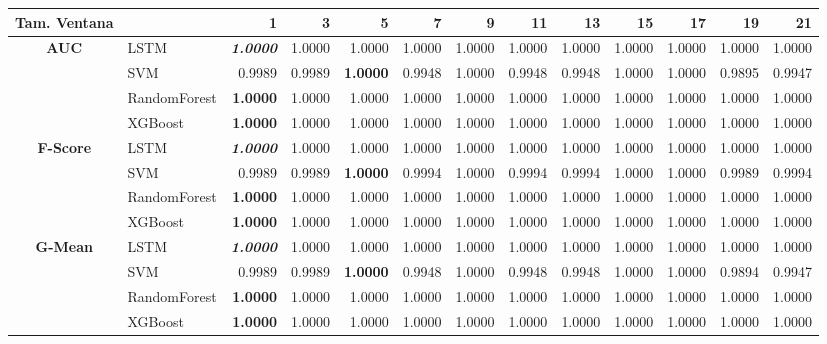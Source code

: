 \begin{table}[H]
	\centering
	\begin{adjustbox}{max width=13cm}
		\begin{tabular}{|c|l|r|r|r|r|r|r|r|r|r|r|r|}
			\hline
			\textbf{Tam. Ventana}&         &      1  &      3  &   5  &      7  &   9  &      11 &      13 &   15 &   17 &      19 &      21 \\
			\hline
			\textbf{AUC} &  LSTM & \textit{ \textbf{  1.0000 } } &  1.0000 &  1.0000 &  1.0000 &  1.0000 &  1.0000 &  1.0000 &  1.0000 &  1.0000 &  1.0000 &  1.0000 \\
			&  SVM &  0.9989 &  0.9989 & \textbf{  1.0000 } &  0.9948 &  1.0000 &  0.9948 &  0.9948 &  1.0000 &  1.0000 &  0.9895 &  0.9947 \\
			&  RandomForest & \textbf{  1.0000 } &  1.0000 &  1.0000 &  1.0000 &  1.0000 &  1.0000 &  1.0000 &  1.0000 &  1.0000 &  1.0000 &  1.0000 \\
			&  XGBoost & \textbf{  1.0000 } &  1.0000 &  1.0000 &  1.0000 &  1.0000 &  1.0000 &  1.0000 &  1.0000 &  1.0000 &  1.0000 &  1.0000 \\
			\hline
			\textbf{F-Score} &  LSTM & \textit{ \textbf{  1.0000 } } &  1.0000 &  1.0000 &  1.0000 &  1.0000 &  1.0000 &  1.0000 &  1.0000 &  1.0000 &  1.0000 &  1.0000 \\
			&  SVM &  0.9989 &  0.9989 & \textbf{  1.0000 } &  0.9994 &  1.0000 &  0.9994 &  0.9994 &  1.0000 &  1.0000 &  0.9989 &  0.9994 \\
			&  RandomForest & \textbf{  1.0000 } &  1.0000 &  1.0000 &  1.0000 &  1.0000 &  1.0000 &  1.0000 &  1.0000 &  1.0000 &  1.0000 &  1.0000 \\
			&  XGBoost & \textbf{  1.0000 } &  1.0000 &  1.0000 &  1.0000 &  1.0000 &  1.0000 &  1.0000 &  1.0000 &  1.0000 &  1.0000 &  1.0000 \\
			\hline
			\textbf{G-Mean} &  LSTM & \textit{ \textbf{  1.0000 } } &  1.0000 &  1.0000 &  1.0000 &  1.0000 &  1.0000 &  1.0000 &  1.0000 &  1.0000 &  1.0000 &  1.0000 \\
			&  SVM &  0.9989 &  0.9989 & \textbf{  1.0000 } &  0.9948 &  1.0000 &  0.9948 &  0.9948 &  1.0000 &  1.0000 &  0.9894 &  0.9947 \\
			&  RandomForest & \textbf{  1.0000 } &  1.0000 &  1.0000 &  1.0000 &  1.0000 &  1.0000 &  1.0000 &  1.0000 &  1.0000 &  1.0000 &  1.0000 \\
			&  XGBoost & \textbf{  1.0000 } &  1.0000 &  1.0000 &  1.0000 &  1.0000 &  1.0000 &  1.0000 &  1.0000 &  1.0000 &  1.0000 &  1.0000 \\

\end{tabular}
\end{adjustbox}
\end{table}
